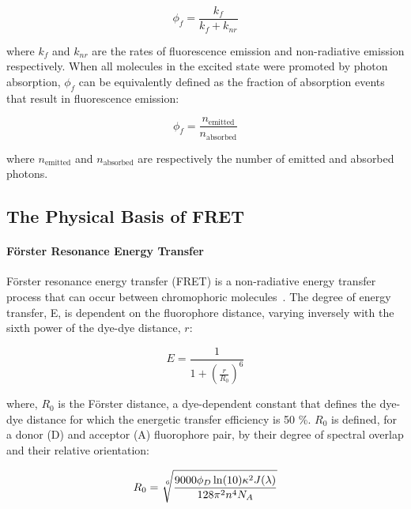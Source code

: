\begin{equation}
\phi_f = \frac{k_f}{k_f + k_{nr}}
\label{eq:quantum_yield}
\end{equation}

where $k_f$ and $k_{nr}$ are the rates of fluorescence emission and non-radiative emission respectively. When all molecules in the excited state were promoted by photon absorption, $\phi_f$ can be equivalently defined as the fraction of absorption events that result in fluorescence emission: 


\begin{equation}
\phi_f = \frac{n_{\text{emitted}}}{n_{\text{absorbed}}}
\label{eq:quantum_yield_ratio}
\end{equation}

where $n_{\text{emitted}}$ and $n_{\text{absorbed}}$ are respectively the number of emitted and absorbed photons.


\subsection{The Physical Basis of FRET}
\label{sect:fret}
\paragraph{F\"{o}rster Resonance Energy Transfer}
F\"{o}rster resonance energy transfer (FRET) is a non-radiative energy transfer process that can occur between chromophoric molecules~\cite{forster48}. The degree of energy transfer, E, is dependent on the fluorophore distance, varying inversely with the sixth power of the dye-dye distance, $r$: 

\begin{equation}
E = \frac{1}{1+ (\frac{r}{R_0})^6}
\label{eq:FRET_d}
\end{equation}

where, $R_0$ is the F\"{o}rster distance, a dye-dependent constant that defines the dye-dye distance for which the energetic transfer efficiency is 50 \%. $R_0$ is defined, for a donor (D) and acceptor (A) fluorophore pair, by their degree of spectral overlap and their relative orientation:

\begin{equation}
R_0 = \sqrt[\leftroot{-2}\uproot{2}6]{\frac{9000\phi_D\ln(10)\kappa^2J(\lambda)}{128\pi^2n^4N_A}}
\label{eq:R_0}
\end{equation}

